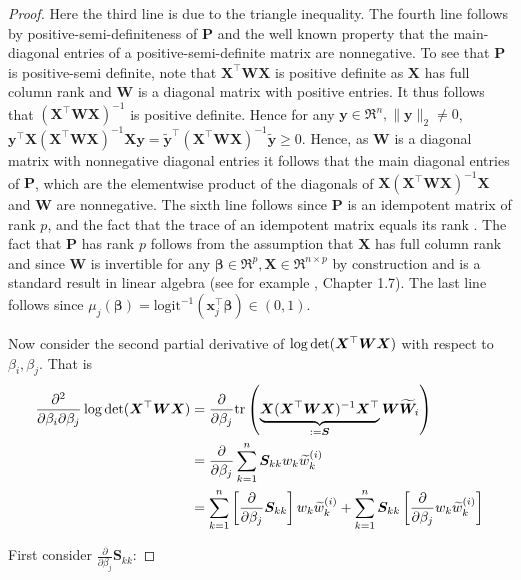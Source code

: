 \documentclass[11pt, a4paper]{article}
\newcommand*{\bb}{\boldsymbol}
\theoremstyle{example} \newtheorem{example}{Example}[section]
\theoremstyle{theorem} \newtheorem{theorem}{Theorem}[section]
\theoremstyle{theorem }\newtheorem{proposition}{Proposition}[section]
\theoremstyle{theorem }\newtheorem{corollary}{Corollary}[section]
\def\det{{\mathop{\rm det}}}
\def\\bbeta{\bb{\\bbeta}}
\begin{document}
\begin{proof}
Here the third line is due to the triangle inequality. The fourth line follows by positive-semi-definiteness of $\bb P$ and the well known property that the main-diagonal entries of a positive-semi-definite matrix are nonnegative. To see that $\bb P$ is positive-semi definite, note that $\bb X^\top\bb W\bb X$ is positive definite as $\bb X$ has full column rank and $\bb W$ is a diagonal matrix with positive entries. It thus follows that $(\bb X^\top\bb W\bb X)^{-1}$ is positive definite. Hence for any $\bb y \in \Re^{n}, \|\bb y\|_2\neq 0$, $\bb y^\top\bb X(\bb X^\top\bb W\bb X)^{-1}\bb X \bb y = \tilde{\bb y}^\top(\bb X^\top\bb W\bb X)^{-1} \tilde{\bb y} \geq 0$. Hence, as $\bb W$ is a diagonal matrix with nonnegative diagonal entries it follows that the main diagonal entries of $\bb P$, which are the elementwise product of the diagonals of $\bb X(\bb X^\top\bb W\bb X)^{-1}\bb X$ and $\bb W$ are nonnegative. The sixth line follows since $\bb P$ is an idempotent matrix of rank $p$, and the fact that the trace of an idempotent matrix equals its rank \citep[Corollary 10.2.2]{harville1998matrix}. The fact that $\bb P$ has rank $p$ follows from the assumption that $\bb X$ has full column rank and since $\bb W$ is invertible for any $\bb\beta \in \Re^p,\bb X\in \Re^{n \times p}$ by construction and is a standard result in linear algebra (see for example \cite{magnus2019matrix}, Chapter 1.7).  The last line follows since $\mu_j(\bb\beta) = \textrm{logit}^{-1}(\bb x_j^{\top}\bb \beta) \in (0,1)$. 

Now consider the second partial derivative of $\log \det(\bb X^\top\bb W\bb X)$ with respect to $\beta_i,\beta_j$. That is 
\begin{equation}
\begin{aligned}
\frac{\partial^2}{\partial \beta_i \partial \beta_j} \log\det (\bb X^\top\bb W \bb X) &= \frac{\partial}{\partial \beta_j} \textrm{tr}\left( \underbrace{\bb X(\bb X^\top\bb W\bb X)^{-1}\bb X^\top}_{:=\bb S}\bb W\widetilde{\bb W}_i\right) \\ 
&= \frac{\partial}{\partial \beta_j} \sum_{k=1}^{n}\bb S_{kk}w_k \widetilde{w}^{(i)}_k \\ 
&= \sum_{k=1}^{n}\left[\frac{\partial}{\partial \beta_j}\bb S_{kk}\right]w_k \widetilde{w}^{(i)}_k + \sum_{k=1}^{n}\bb S_{kk}\left[\frac{\partial}{\partial \beta_j}w_k \widetilde{w}^{(i)}_k\right]
\end{aligned}
\end{equation}

First consider $\frac{\partial}{\partial \beta_j}\bb S_{kk}$: 


\end{proof}
\end{document}
